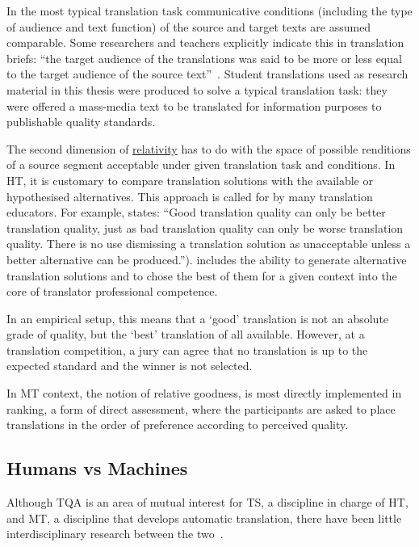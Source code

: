 In the most typical translation task communicative conditions (including the type of audience and text function) of the source and target texts are assumed comparable. Some researchers and teachers explicitly indicate this in translation briefs: ``the target audience of the translations was said to be more or less equal to the target audience of the source text''~\cite{Daems2013}. Student translations used as research material in this thesis were produced to solve a typical translation task: they were offered a mass-media text to be translated for information purposes to publishable quality standards.

The second dimension of \hyperlink{wd:relativity}{relativity} has to do with the space of possible renditions of a source segment acceptable under given translation task and conditions. In HT, it is customary to compare translation solutions with the available or hypothesised alternatives. 
This approach is called for by many translation educators. For example, \citet[p.172]{Bittner2020} states: ``Good translation quality can only be better translation quality, just as bad translation quality can only be worse translation quality. There is no use dismissing a translation solution as unacceptable unless a better alternative can be produced.''). \citet{Pym2003} includes the ability to generate alternative translation solutions and to chose the best of them for a given context into the core of translator professional competence. 

In an empirical setup, this means that a `good' translation is not an absolute grade of quality, but the `best' translation of all available. However, at a translation competition, a jury can agree that no translation is up to the expected standard and the winner is not selected.

In MT context, the notion of relative goodness, is most directly implemented in ranking, a form of direct assessment, where the participants are asked to place translations in the order of preference according to perceived quality.

\subsection{\label{ssec:versus}Humans vs Machines}
Although \gls{TQA} is an area of mutual interest for TS, a discipline in charge of HT, and MT, a discipline that develops automatic translation, there have been little interdisciplinary research between the two~\cite{Ahrenberg2017}. 

